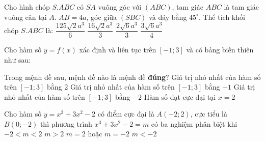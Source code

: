 \begin{ex}%
Cho hình chóp $S.ABC$ có $SA$ vuông góc với $\left(ABC\right)$, tam giác $ABC$ là tam giác vuông cân tại $A$. $AB = 4a$, góc giữa $\left(SBC\right)$ và đáy bằng ${45}^{\circ}$. Thể tích khối chóp $S.ABC$ là:
\choice
{$\dfrac{125\sqrt{2}a^3}{6}$}
{\True $\dfrac{16\sqrt{2}a^3}{3}$}
{$\dfrac{2\sqrt{6}a^3}{3}$}
{ $\dfrac{3\sqrt{6}a^3}{4}$}
\end{ex}
\begin{ex}%
Cho hàm số $y = f(x)$ xác định và liên tục trên $[- 1; 3]$ và có bảng biến thiên như sau:
\begin{center}
\end{center}
Trong mệnh đề sau, mệnh đề nào là mệnh đề \textbf{đúng}?
\choice
{Giá trị nhỏ nhất của hàm số trên $ [- 1; 3]$ bằng 2}
{Giá trị nhỏ nhất của hàm số trên $ [- 1; 3]$ bằng $-1$}
{\True Giá trị nhỏ nhất của hàm số trên $ [ - 1; 3]$ bằng $-2$}
{Hàm số đạt cực đại tại $x = 2$}
\end{ex}
\begin{ex}%
Cho hàm số $y = x^3 + 3x^2 - 2$ có điểm cực đại là $A( - 2; 2)$, cực tiểu là $B(0; - 2)$ thì phương trình $x^3 + 3x^2 - 2 = m$ có ba nghiệm phân biệt khi
\choice
{\True $ - 2 < m < 2$}
{$m > 2$}
{$m = 2$ hoặc $m = - 2$}
{$m < - 2$}
\end{ex}

